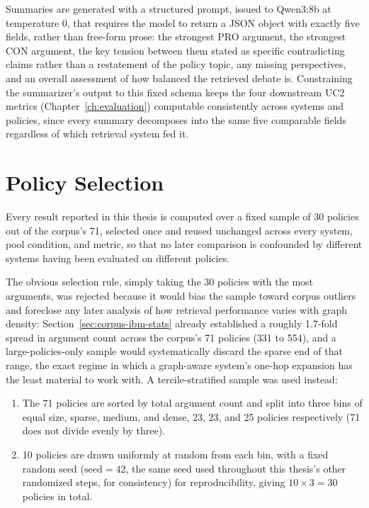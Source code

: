 Summaries are generated with a structured prompt, issued to Qwen3:8b at temperature 0, that
requires the model to return a JSON object with exactly five fields, rather than free-form prose:
the strongest PRO argument, the strongest CON argument, the key tension between them stated as
specific contradicting claims rather than a restatement of the policy topic, any missing
perspectives, and an overall assessment of how balanced the retrieved debate is. Constraining the
summarizer's output to this fixed schema keeps the four downstream UC2 metrics
(Chapter~\ref{ch:evaluation}) computable consistently across systems and policies, since every
summary decomposes into the same five comparable fields regardless of which retrieval system fed
it.

\section{Policy Selection}
\label{sec:methodology-policy-selection}

Every result reported in this thesis is computed over a fixed sample of 30 policies out of the
corpus's 71, selected once and reused unchanged across every system, pool condition, and metric,
so that no later comparison is confounded by different systems having been evaluated on different
policies.

The obvious selection rule, simply taking the 30 policies with the most arguments, was rejected
because it would bias the sample toward corpus outliers and foreclose any later analysis of how
retrieval performance varies with graph density: Section~\ref{sec:corpus-ibm-stats} already
established a roughly 1.7-fold spread in argument count across the corpus's 71 policies (331 to
554), and a large-policies-only sample would systematically discard the sparse end of that range,
the exact regime in which a graph-aware system's one-hop expansion has the least material to work
with. A tercile-stratified sample was used instead:

\begin{enumerate}
\item The 71 policies are sorted by total argument count and split into three bins of equal size,
sparse, medium, and dense, 23, 23, and 25 policies respectively (71 does not divide evenly by
three).

\item 10 policies are drawn uniformly at random from each bin, with a fixed random seed
($\text{seed}=42$, the same seed used throughout this thesis's other randomized steps, for
consistency) for reproducibility, giving $10 \times 3 = 30$ policies in total.
\end{enumerate}

